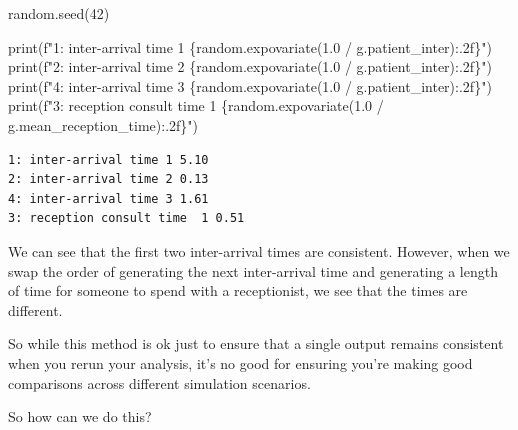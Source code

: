 \documentclass[
  letterpaper,
  DIV=11,
  numbers=noendperiod]{scrreprt}
\newenvironment{Shaded}{}{}
\newcommand{\BuiltInTok}[1]{\textcolor[rgb]{0.84,0.23,0.29}{#1}}
\newcommand{\DecValTok}[1]{\textcolor[rgb]{0.00,0.36,0.77}{#1}}
\newcommand{\FloatTok}[1]{\textcolor[rgb]{0.00,0.36,0.77}{#1}}
\newcommand{\NormalTok}[1]{\textcolor[rgb]{0.14,0.16,0.18}{#1}}
\newcommand{\OperatorTok}[1]{\textcolor[rgb]{0.14,0.16,0.18}{#1}}
\newcommand{\SpecialCharTok}[1]{\textcolor[rgb]{0.00,0.36,0.77}{#1}}
\newcommand{\SpecialStringTok}[1]{\textcolor[rgb]{0.01,0.18,0.38}{#1}}
\begin{document}
\begin{tcolorbox}
\begin{Shaded}
\begin{Highlighting}[]
\NormalTok{random.seed(}\DecValTok{42}\NormalTok{)}

\BuiltInTok{print}\NormalTok{(}\SpecialStringTok{f"1: inter{-}arrival time 1 }\SpecialCharTok{\{}\NormalTok{random}\SpecialCharTok{.}\NormalTok{expovariate(}\FloatTok{1.0} \OperatorTok{/}\NormalTok{ g.patient\_inter)}\SpecialCharTok{:.2f\}}\SpecialStringTok{"}\NormalTok{)}
\BuiltInTok{print}\NormalTok{(}\SpecialStringTok{f"2: inter{-}arrival time 2 }\SpecialCharTok{\{}\NormalTok{random}\SpecialCharTok{.}\NormalTok{expovariate(}\FloatTok{1.0} \OperatorTok{/}\NormalTok{ g.patient\_inter)}\SpecialCharTok{:.2f\}}\SpecialStringTok{"}\NormalTok{)}
\BuiltInTok{print}\NormalTok{(}\SpecialStringTok{f"4: inter{-}arrival time 3 }\SpecialCharTok{\{}\NormalTok{random}\SpecialCharTok{.}\NormalTok{expovariate(}\FloatTok{1.0} \OperatorTok{/}\NormalTok{ g.patient\_inter)}\SpecialCharTok{:.2f\}}\SpecialStringTok{"}\NormalTok{)}
\BuiltInTok{print}\NormalTok{(}\SpecialStringTok{f"3: reception consult time  1 }\SpecialCharTok{\{}\NormalTok{random}\SpecialCharTok{.}\NormalTok{expovariate(}\FloatTok{1.0} \OperatorTok{/}\NormalTok{ g.mean\_reception\_time)}\SpecialCharTok{:.2f\}}\SpecialStringTok{"}\NormalTok{)}
\end{Highlighting}
\end{Shaded}

\begin{verbatim}
1: inter-arrival time 1 5.10
2: inter-arrival time 2 0.13
4: inter-arrival time 3 1.61
3: reception consult time  1 0.51
\end{verbatim}

We can see that the first two inter-arrival times are consistent.
However, when we swap the order of generating the next inter-arrival
time and generating a length of time for someone to spend with a
receptionist, we see that the times are different.

\end{tcolorbox}

\begin{tcolorbox}[enhanced jigsaw, colframe=quarto-callout-warning-color-frame, bottomtitle=1mm, breakable, rightrule=.15mm, coltitle=black, colbacktitle=quarto-callout-warning-color!10!white, opacityback=0, leftrule=.75mm, arc=.35mm, toptitle=1mm, title=\textcolor{quarto-callout-warning-color}{\faExclamationTriangle}\hspace{0.5em}{Warning}, titlerule=0mm, colback=white, toprule=.15mm, bottomrule=.15mm, left=2mm, opacitybacktitle=0.6]

So while this method is ok just to ensure that a single output remains
consistent when you rerun your analysis, it's no good for ensuring
you're making good comparisons across different simulation scenarios.

So how can we do this?

\end{tcolorbox}
\end{document}
